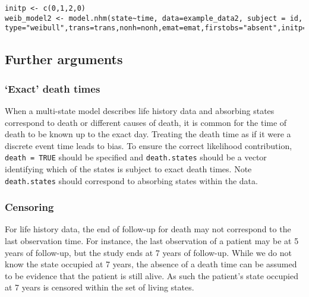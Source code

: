 \documentclass{article}
\numberwithin{equation}{section}
\begin{document}
\begin{verbatim}
initp <- c(0,1,2,0)
weib_model2 <- model.nhm(state~time, data=example_data2, subject = id,
type="weibull",trans=trans,nonh=nonh,emat=emat,firstobs="absent",initp=initp)
\end{verbatim}
%
\subsection{Further arguments}

\subsubsection{`Exact' death times}

When a multi-state model describes life history data and absorbing states correspond to death or different causes of death, it is common for the time of death to be known up to the exact day. Treating the death time as if it were a discrete event time leads to bias. To ensure the correct likelihood contribution, \verb!death = TRUE! should be specified and \verb!death.states! should be a vector identifying which of the states is subject to exact death times. Note \verb!death.states! should correspond to absorbing states within the data.

\subsubsection{Censoring}

For life history data, the end of follow-up for death may not correspond to the last observation time. For instance, the last observation of a patient may be at 5 years of follow-up, but the study ends at 7 years of follow-up. While we do not know the state occupied at 7 years, the absence of a death time can be assumed to be evidence that the patient is still alive. As such the patient's state occupied at 7 years is censored within the set of living states.
\end{document}
